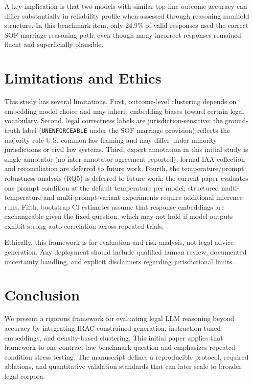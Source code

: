 \documentclass[11pt]{article}
\begin{document}
A key implication is that two models with similar top-line outcome accuracy can differ substantially in reliability profile when assessed through reasoning manifold structure. In this benchmark item, only 24.9\% of valid responses used the correct SOF-marriage reasoning path, even though many incorrect responses remained fluent and superficially plausible.

\section{Limitations and Ethics}
This study has several limitations. First, outcome-level clustering depends on embedding model choice and may inherit embedding biases toward certain legal vocabulary. Second, legal correctness labels are jurisdiction-sensitive; the ground-truth label (\texttt{UNENFORCEABLE} under the SOF marriage provision) reflects the majority-rule U.S. common law framing and may differ under minority jurisdictions or civil law systems. Third, expert annotation in this initial study is single-annotator (no inter-annotator agreement reported); formal IAA collection and reconciliation are deferred to future work. Fourth, the temperature/prompt robustness analysis (RQ5) is deferred to future work: the current paper evaluates one prompt condition at the default temperature per model; structured multi-temperature and multi-prompt-variant experiments require additional inference runs. Fifth, bootstrap CI estimates assume that response embeddings are exchangeable given the fixed question, which may not hold if model outputs exhibit strong auto-correlation across repeated trials.

Ethically, this framework is for evaluation and risk analysis, not legal advice generation. Any deployment should include qualified human review, documented uncertainty handling, and explicit disclaimers regarding jurisdictional limits.

\section{Conclusion}
We present a rigorous framework for evaluating legal LLM reasoning beyond accuracy by integrating IRAC-constrained generation, instruction-tuned embeddings, and density-based clustering. This initial paper applies that framework to one contract-law benchmark question and emphasizes repeated-condition stress testing. The manuscript defines a reproducible protocol, required ablations, and quantitative validation standards that can later scale to broader legal corpora.
\end{document}
